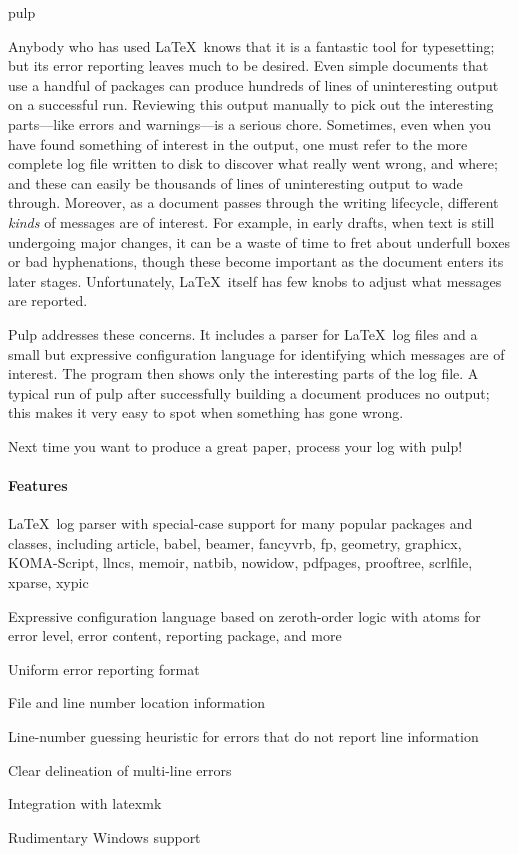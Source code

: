\documentclass{scrreprt}
\begin{document}
\begin{hcarentry}{pulp}
\makeheader

Anybody who has used \LaTeX\ knows that it is a fantastic tool for
typesetting; but its error reporting leaves much to be desired. Even simple
documents that use a handful of packages can produce hundreds of lines of
uninteresting output on a successful run. Reviewing this output manually to
pick out the interesting parts---like errors and warnings---is a serious
chore. Sometimes, even when you have found something of interest in the
output, one must refer to the more complete log file written to disk to
discover what really went wrong, and where; and these can easily be
thousands of lines of uninteresting output to wade through. Moreover, as a
document passes through the writing lifecycle, different \emph{kinds} of
messages are of interest. For example, in early drafts, when text is still
undergoing major changes, it can be a waste of time to fret about underfull
boxes or bad hyphenations, though these become important as the document
enters its later stages. Unfortunately, \LaTeX\ itself has few knobs to
adjust what messages are reported.

Pulp addresses these concerns. It includes a parser for \LaTeX\ log files
and a small but expressive configuration language for identifying which
messages are of interest. The program then shows only the interesting parts
of the log file. A typical run of pulp after successfully building a
document produces no output; this makes it very easy to spot when something
has gone wrong.

Next time you want to produce a great paper, process your log with pulp!

\paragraph*{Features}
\begin{compactitem}
	\item \LaTeX\ log parser with special-case support for many popular
		packages and classes, including article, babel, beamer, fancyvrb,
		fp, geometry, graphicx, KOMA-Script, llncs, memoir, natbib, nowidow,
		pdfpages, prooftree, scrlfile, xparse, xypic
	\item Expressive configuration language based on zeroth-order logic with
		atoms for error level, error content, reporting package, and more
	\item Uniform error reporting format
		\begin{compactitem}
			\item File and line number location information
			\item Line-number guessing heuristic for errors that do not
				report line information
			\item Clear delineation of multi-line errors
		\end{compactitem}
	\item Integration with latexmk
	\item Rudimentary Windows support
\end{compactitem}


\end{hcarentry}
\end{document}
